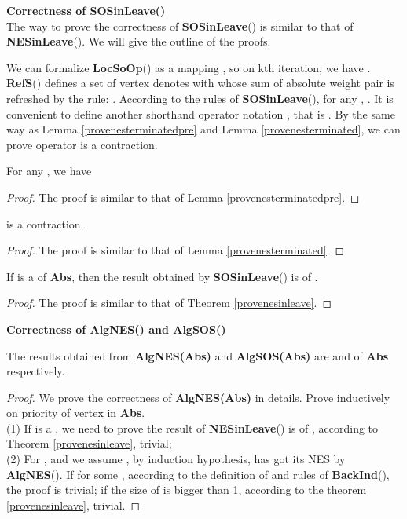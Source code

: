 \documentclass{acm_proc_article-sp}
\begin{document}
\textbf{Correctness of \textbf{SOSinLeave}()}\\
The way to prove the correctness of \textbf{SOSinLeave}() is similar to that of \textbf{NESinLeave}(). We will give the outline of the proofs.

We can formalize \textbf{LocSoOp}() as a mapping , so on kth iteration, we have . \textbf{RefS}() defines a set of vertex  denotes  with  whose sum of absolute weight pair is refreshed by the rule: . According to the rules of  \textbf{SOSinLeave}(), for any ,  . It is convenient to define another shorthand operator notation , that is . By the same way as Lemma \ref{provenesterminatedpre} and Lemma \ref{provenesterminated}, we can prove operator  is a contraction.

\begin{Lemma}
\label{provesosterminatedpre}
For any , we have\\

\end{Lemma}

\begin{proof}
The proof is similar to that of Lemma \ref{provenesterminatedpre}.
\end{proof}

\begin{Lemma}
\label{provesosterminated}
 is a contraction.
\end{Lemma}

\begin{proof}
The proof is similar to that of Lemma \ref{provenesterminated}.
\end{proof}
\begin{Theorem}
If  is a  of \textbf{Abs}, then the result obtained by \textbf{SOSinLeave}() is  of .
\end{Theorem}
\begin{proof}
The proof is similar to that of Theorem \ref{provenesinleave}.
\end{proof}

\textbf{Correctness of AlgNES() and AlgSOS()}
\begin{Theorem}
The results obtained from \textbf{AlgNES(Abs)} and \textbf{AlgSOS(Abs)} are  and  of \textbf{Abs} respectively.
\end{Theorem}
\begin{proof}
We prove the correctness of \textbf{AlgNES(Abs)} in details. Prove inductively on priority of vertex  in \textbf{Abs}.\\
(1) If  is a , we need to prove the result of \textbf{NESinLeave}() is  of , according to Theorem \ref{provenesinleave}, trivial;\\
(2) For  , and we assume , by induction hypothesis,  has got its NES by \textbf{AlgNES}(). If  for some , according to the definition of  and rules of \textbf{BackInd}(), the proof is trivial; if the size of  is bigger than 1, according to the theorem \ref{provenesinleave}, trivial.
\end{proof}
\end{document}
